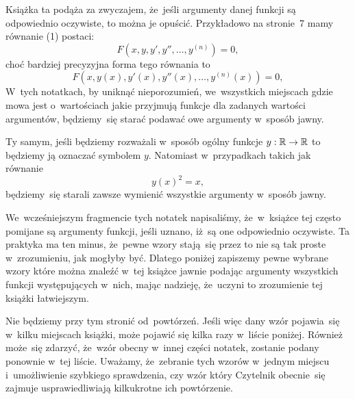 \documentclass[a4paper,11pt]{article}
\numberwithin{equation}{section}
\begin{document}
\label{sec:Uwagi-ogolne}



Książka ta podąża za zwyczajem, że~jeśli argumenty danej funkcji są
odpowiednio oczywiste, to można je opuścić. Przykładowo na stronie~7
mamy równanie (1) postaci:
\begin{equation}
  \label{eq:Uwagi-ogolne-01}
  F\left( x, y, y', y'', \ldots, y^{ ( n ) } \right) = 0,
\end{equation}
choć bardziej precyzyjna forma tego równania to
\begin{equation}
  \label{eq:Uwagi-ogolne-02}
  F\left( x, y( x ), y'( x ), y''( x ), \ldots, y^{ ( n ) }( x ) \right) = 0,
\end{equation}
W~tych notatkach, by uniknąć nieporozumień, we~wszystkich miejscach gdzie
mowa jest o~wartościach jakie przyjmują funkcje dla zadanych wartości
argumentów, będziemy~się starać podawać owe argumenty w~sposób jawny.

Ty samym, jeśli będziemy rozważali w~sposób ogólny funkcje
$y : \mathbb{R} \to \mathbb{R}$ to będziemy ją oznaczać symbolem $y$. Natomiast
w~przypadkach takich jak równanie
\begin{equation}
  \label{eq:Uwagi-ogolne-03}
  y( x )^{ 2 } = x,
\end{equation}
będziemy~się starali zawsze wymienić wszystkie argumenty w~sposób jawny.

\VerSpaceFour





\noindent
We~wcześniejszym fragmencie tych notatek napisaliśmy, że~w~książce tej
często pomijane są argumenty funkcji, jeśli uznano, iż~są one odpowiednio
oczywiste. Ta praktyka ma ten minus, że~pewne wzory stają~się przez to
nie są tak proste w~zrozumieniu, jak mogłyby być. Dlatego poniżej zapiszemy
pewne wybrane wzory które można znaleźć w~tej książce jawnie podając
argumenty wszystkich funkcji występujących w~nich, mając nadzieję,
że~uczyni to zrozumienie tej książki łatwiejszym.

Nie będziemy przy tym stronić od~powtórzeń. Jeśli więc dany wzór pojawia~się
w~kilku miejscach książki, może pojawić się kilka razy w~liście poniżej.
Również może~się zdarzyć, że~wzór obecny w~innej części notatek, zostanie
podany ponownie w~tej liście. Uważamy, że~zebranie tych wzorów w~jednym
miejscu i~umożliwienie szybkiego sprawdzenia, czy wzór który Czytelnik
obecnie~się zajmuje usprawiedliwiają kilkukrotne ich powtórzenie.
\end{document}
